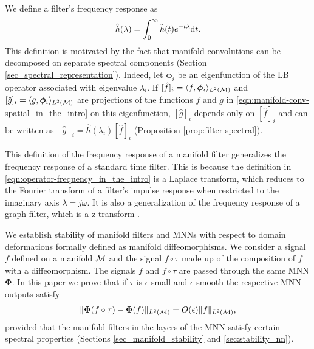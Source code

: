  We define a filter's frequency response as  
%
\begin{equation}\label{eqn:operator-frequency_in_the_intro}
    \hat{h}(\lambda)=\int_0^\infty {\ensuremath{\tilde h}}(t) e^{- t \lambda  }\text{d}t \text{.}
\end{equation}
%
This definition is motivated by the fact that manifold convolutions can be decomposed on separate spectral components (Section \ref{sec_spectral_representation}). Indeed, let $\bm\phi_i$ be an eigenfunction of the LB operator associated with eigenvalue $\lambda_i$. If $[\hat{f}]_i = \langle f, \bm\phi_i \rangle_{L^2({\mathcal M})}$ and $[\hat{g}]_i = \langle g, \bm\phi_i \rangle_{L^2({\mathcal M})}$ are projections of the functions $f$ and $g$ in \eqref{eqn:manifold-conv-spatial_in_the_intro} on this eigenfunction, $[\hat{g}]_i$ depends only on $[\hat{f}]_i$ and can be written as $[\hat{g}]_i = \hat{h}(\lambda_i) [\hat{f}]_i$ (Proposition \ref{prop:filter-spectral}). 

This definition of the frequency response of a manifold filter generalizes the frequency response of a standard time filter. This is because the definition in \eqref{eqn:operator-frequency_in_the_intro} is a Laplace transform, which reduces to the Fourier transform of a filter's impulse response when restricted to the imaginary axis $\lambda=j\omega$. It is also a generalization of the frequency response of a graph filter, which is a z-transform \cite{oppenheim1997signals}.

 We establish stability of manifold filters and MNNs with respect to domain deformations formally defined as manifold diffeomorphisms. We consider a signal $f$ defined on a manifold ${\mathcal M}$ and the signal $f\circ\tau$ made up of the composition of $f$ with a diffeomorphism. The signals $f$ and $f \circ \tau$ are passed through the same MNN $\bm\Phi$. In this paper we prove that if $\tau$ is $\epsilon$-small and $\epsilon$-smooth the respective MNN outputs satisfy
%
\begin{align}\label{eqn_bound_for_intro}
   \| \bm\Phi(f \circ \tau)-\bm\Phi(f)\|_{L^2({\mathcal M})}=O(\epsilon)\|f\|_{L^2({\mathcal M})},    
\end{align}
%
provided that the manifold filters in the layers of the MNN satisfy certain spectral properties (Sections \ref{sec_manifold_stability} and \ref{sec:stability_nn}). 

